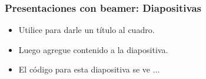 \begin{frame}[fragile]
  \frametitle{Presentaciones con beamer: Diapositivas}
  \begin{itemize}
  \item Utilice  para darle un t\'itulo al cuadro.
  \item Luego agregue contenido a la diapositiva.
  \item El c\'odigo para esta diapositiva se ve ...
  \end{itemize}
\end{frame}


